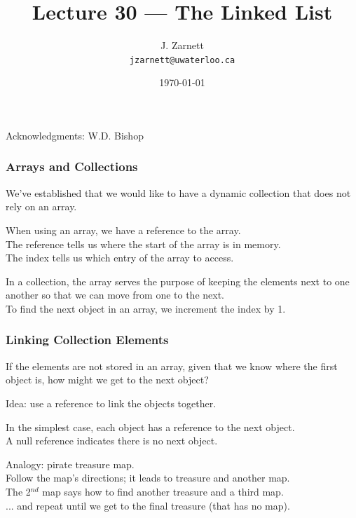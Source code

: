 

\title{Lecture 30 --- The Linked List}

\author{J. Zarnett\\
\texttt{jzarnett@uwaterloo.ca}}
\date{\today}



\begin{frame}
  \titlepage
  
  \begin{center}
  \small{Acknowledgments: W.D. Bishop}
  \end{center}
\end{frame}

\begin{frame}
\frametitle{Arrays and Collections}
We've established that we would like to have a dynamic collection that does not rely on an array.

When using an array, we have a reference to the array.\\
\quad The reference tells us where the start of the array is in memory.\\
\quad The index tells us which entry of the array to access.

In a collection, the array serves the purpose of keeping the elements next to one another so that we can move from one to the next.\\
\quad To find the next object in an array, we increment the index by 1.

\end{frame}

\begin{frame}
\frametitle{Linking Collection Elements}
If the elements are not stored in an array, given that we know where the first object is, how might we get to the next object?

Idea: use a reference to link the objects together.

In the simplest case, each object has a reference to the next object.\\
\quad A null reference indicates there is no next object.

Analogy: pirate treasure map.\\
\quad Follow the map's directions; it leads to treasure and another map.\\
\quad The 2$^{nd}$ map says how to find another treasure and a third map.\\
\quad ... and repeat until we get to the final treasure (that has no map).

\end{frame}

